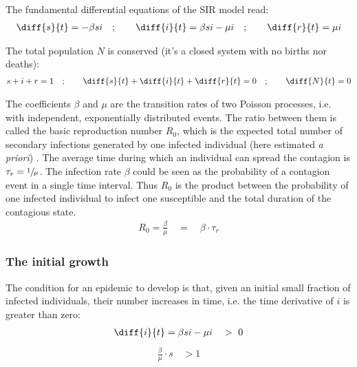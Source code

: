 \documentclass[DIV=12, BCOR=0pt]{scrartcl}  %
\begin{document}
  The fundamental differential equations of the SIR model read:
  \begin{align}
  	\diff{s}{t} = - \beta s i \quad;  \qquad 	\diff{i}{t} = \beta s i - \mu i \quad; \qquad  \diff{r}{t} = \mu i
  	\label{eq:sir}
  \end{align}

  The total population $N$ is conserved (it's a closed system with no births nor deaths):  
  \begin{align}
  	s + i + r = 1 \quad ; \qquad \diff{s}{t} + \diff{i}{t} + \diff{r}{t} = 0  \quad ; \qquad  \diff{N}{t}= 0
  	\label{eq:sir_sum}
  \end{align}

  The coefficients $\beta$ and $\mu$ are the transition rates of two Poisson processes, i.e. with independent, exponentially distributed events. The ratio between them is called the basic reproduction number $R_0$, which is the expected total number of secondary infections generated by one infected individual (here estimated \textit{a priori}) \citep{R0}.   
  The average time during which an individual can spread the contagion is $\tau_{r} = \sfrac{1}{\mu}$. The infection rate $\beta$ could be seen as the probability of a contagion event in a single time interval. Thus $R_0$ is the product between the probability of one infected individual to infect one susceptible and the total duration of the contagious state.
  \begin{align}
			R_0 = \frac{\beta}{\mu} \quad = \quad \beta \cdot \tau_{r}
			\label{eq:R0}
  \end{align}

  \subsubsection{The initial growth}
  The condition for an epidemic to develop is that, given an initial small fraction of infected individuals, their number increases in time, i.e. the time derivative of $i$ is greater than zero:
  \begin{align}
  	\diff{i}{t} = \beta s i - \mu i \quad > \ 0 
  	\label{sir_growthCond}
  \end{align}
  \begin{align} %
  	\frac{\beta }{\mu} \cdot s \quad > 1  %
  	\label{eq:sir_growthReq}
  \end{align}
  
\end{document}
